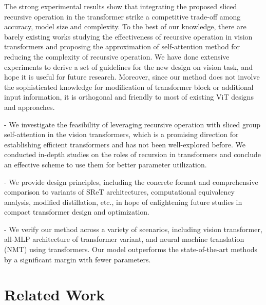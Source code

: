 \documentclass[runningheads]{llncs}
\begin{document}
	The strong experimental results show that integrating the proposed sliced recursive operation in the transformer strike a competitive trade-off among accuracy, model size and complexity. To the best of our knowledge, there are barely existing works studying the effectiveness of recursive operation in vision transformers and proposing the approximation of self-attention method for reducing the complexity of recursive operation. We have done extensive experiments to derive a set of guidelines for the new design on vision task, and hope it is useful for future research. Moreover, since our method does not involve the sophisticated knowledge for modification of transformer block or additional input information, it is orthogonal and friendly to most of existing ViT designs and approaches.
	
	
	- We investigate the feasibility of leveraging recursive operation with sliced group self-attention in the vision transformers, which is a promising direction for establishing efficient transformers and has not been well-explored before. We conducted in-depth studies on the roles of recursion in transformers and conclude an effective scheme to use them for better parameter utilization.
	
	- We provide design principles, including the concrete format and comprehensive comparison to variants of SReT architectures, computational equivalency analysis, modified distillation, etc., in hope of enlightening future studies in compact transformer design and optimization.
	
	- We verify our method across a variety of scenarios, including vision transformer, all-MLP architecture of transformer variant, and neural machine translation (NMT) using transformers. Our model outperforms the state-of-the-art methods by a significant margin with fewer parameters.
	
	\section{Related Work}
	
\end{document}

